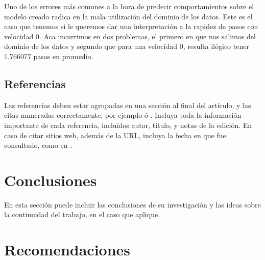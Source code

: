 \documentclass[a4paper,10pt,twocolumn]{article}
\begin{document}
			Uno de los errores más comunes a la hora de predecir comportamientos sobre el modelo creado radica en la mala utilización del dominio de los datos. Este es el caso que tenemos si le queremos dar una interpretación a la rapidez de pasos con velocidad 0. Aca incurrimos en dos problemas, el primero en que nos salimos del dominio de los datos y segundo que para una velocidad 0, resulta ilógico tener 1.766077 pasos en promedio.
		
					
	\subsection{Referencias}
  	Las referencias deben estar agrupadas en una sección al final del artículo,
  	y las citas numeradas correctamente, por ejemplo \cite{knuth} ó \cite{goedel}.
  	Incluya toda la información importante de cada referencia, incluídos autor,
  	título, y notas de la edición. En caso de citar sitios web, además
  	de la URL, incluya la fecha en que fue consultado, como en \cite{wiki}.




\section{Conclusiones}\label{sec:conc}

  En esta sección puede incluir las conclusiones de su investigación y las ideas
  sobre la continuidad del trabajo, en el caso que aplique.




\section{Recomendaciones}\label{sec:rec}
\end{document}
